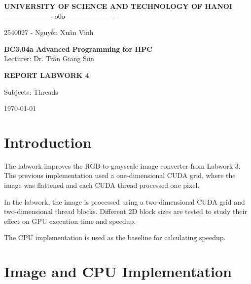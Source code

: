 \documentclass[11pt]{article}
\begin{document}
\begin{center}

{\Large \textbf{UNIVERSITY OF SCIENCE AND TECHNOLOGY OF HANOI}}\\
\vspace{0.3cm}
----------------------o0o----------------------\\

\vspace{4cm}

{\large
\centerline{2540027 - Nguyễn Xuân Vinh}
}

\vspace{4cm}

{\Huge \textbf{BC3.04a Advanced Programming for HPC}}\\
\vspace{0.5cm}
Lecturer: Dr. Trần Giang Sơn

\vspace{4cm}

{\Large \textbf{REPORT LABWORK 4}}\\

\vspace{0.5cm}

{\large
Subjects: Threads
}

\vspace{4cm}
\today
\end{center}

\newpage

\newpage

\tableofcontents

\newpage

\section{Introduction}

The labwork improves the RGB-to-grayscale image converter from Labwork 3.
The previous implementation used a one-dimensional CUDA grid, where the
image was flattened and each CUDA thread processed one pixel.

In the labwork, the image is processed using a two-dimensional CUDA grid
and two-dimensional thread blocks. Different 2D block sizes are tested to
study their effect on GPU execution time and speedup.

The CPU implementation is used as the baseline for calculating speedup.

\section{Image and CPU Implementation}
\end{document}

